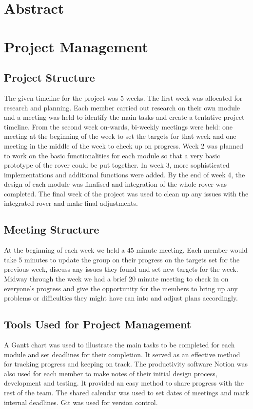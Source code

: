\documentclass[10pt,twoside]{article}
\begin{document}


\newpage

\tableofcontents

\newpage
\section{Abstract}
\section{Project Management}
\subsection{Project Structure}
The given timeline for the project was 5 weeks. The first week was allocated for research and planning. Each member carried out research on their own module and a meeting was held to identify the main tasks and create a tentative project timeline. From the second week on-wards, bi-weekly meetings were held: one meeting at the beginning of the week to set the targets for that week and one meeting in the middle of the week to check up on progress. Week 2 was planned to work on the basic functionalities for each module so that a very basic prototype of the rover could be put together. In week 3, more sophisticated implementations and additional functions were added. By the end of week 4, the design of each module was finalised and integration of the whole rover was completed. The final week of the project was used to clean up any issues with the integrated rover and make final adjustments. 

\subsection{Meeting Structure}
At the beginning of each week we held a 45 minute meeting. Each member would take 5 minutes to update the group on their progress on the targets set for the previous week, discuss any issues they found and set new targets for the week. Midway through the week we had a brief 20 minute meeting to check in on everyone’s progress and give the opportunity for the members to bring up any problems or difficulties they might have ran into and adjust plans accordingly.

\subsection{Tools Used for Project Management}
A Gantt chart was used to illustrate the main tasks to be completed for each module and set deadlines for their completion. It served as an effective method for tracking progress and keeping on track. 
The productivity software Notion was also used for each member to make notes of their initial design process, development and testing. It provided an easy method to share progress with the rest of the team. The shared calendar was used to set dates of meetings and mark internal deadlines. 
Git was used for version control.
\end{document}
